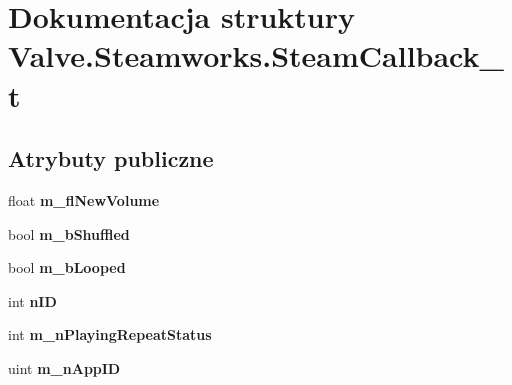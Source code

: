 \hypertarget{struct_valve_1_1_steamworks_1_1_steam_callback__t}{}\section{Dokumentacja struktury Valve.\+Steamworks.\+Steam\+Callback\+\_\+t}
\label{struct_valve_1_1_steamworks_1_1_steam_callback__t}
\subsection*{Atrybuty publiczne}
\begin{DoxyCompactItemize}
\item 
\mbox{\label{struct_valve_1_1_steamworks_1_1_steam_callback__t_af0388bf87e676cd3b101005546a351a5}} 
float {\bfseries m\+\_\+fl\+New\+Volume}
\item 
\mbox{\label{struct_valve_1_1_steamworks_1_1_steam_callback__t_a866c849f47ef29c1670f7ac2712606b0}} 
bool {\bfseries m\+\_\+b\+Shuffled}
\item 
\mbox{\label{struct_valve_1_1_steamworks_1_1_steam_callback__t_aa912765e315c4aa3407175767ff7cdc0}} 
bool {\bfseries m\+\_\+b\+Looped}
\item 
\mbox{\label{struct_valve_1_1_steamworks_1_1_steam_callback__t_ac28330880dafa6c8f594fddce2cd69a3}} 
int {\bfseries n\+ID}
\item 
\mbox{\label{struct_valve_1_1_steamworks_1_1_steam_callback__t_a57b14f2887cb96ea90cacf44c23e60be}} 
int {\bfseries m\+\_\+n\+Playing\+Repeat\+Status}
\item 
\mbox{\label{struct_valve_1_1_steamworks_1_1_steam_callback__t_a543704b158f05418e7741765ce4472fe}} 
uint {\bfseries m\+\_\+n\+App\+ID}
\item 
\mbox{\label{struct_valve_1_1_steamworks_1_1_steam_callback__t_a974a2c6cf1c536594fa19339aa62875b}} 

\end{DoxyCompactItemize}

